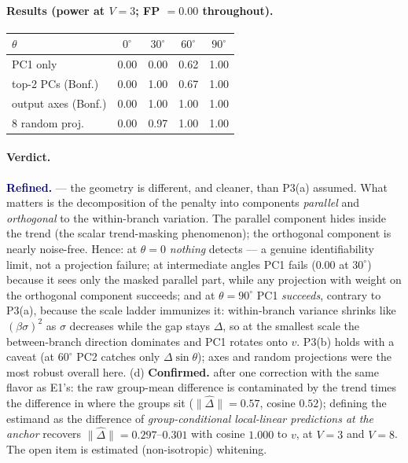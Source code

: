 \documentclass[11pt]{article}
\newcommand{\confirmed}{\textcolor{ok}{\textbf{Confirmed.}}}
\newcommand{\refined}{\textcolor{navy}{\textbf{Refined.}}}
\begin{document}
\paragraph{Results (power at $V{=}3$; FP $=0.00$ throughout).}
\begin{center}\small
\begin{tabular}{lcccc}
\toprule
$\theta$ & $0^\circ$ & $30^\circ$ & $60^\circ$ & $90^\circ$\\
\midrule
PC1 only            & 0.00 & 0.00 & 0.62 & 1.00\\
top-2 PCs (Bonf.)   & 0.00 & 1.00 & 0.67 & 1.00\\
output axes (Bonf.) & 0.00 & 1.00 & 1.00 & 1.00\\
8 random proj.      & 0.00 & 0.97 & 1.00 & 1.00\\
\bottomrule
\end{tabular}
\end{center}

\paragraph{Verdict.} \refined{} --- the geometry is different, and cleaner, than P3(a)
assumed. What matters is the decomposition of the penalty into components \emph{parallel}
and \emph{orthogonal} to the within-branch variation. The parallel component hides inside
the trend (the scalar trend-masking phenomenon); the orthogonal component is nearly
noise-free. Hence: at $\theta=0$ \emph{nothing} detects --- a genuine identifiability
limit, not a projection failure; at intermediate angles PC1 fails ($0.00$ at $30^\circ$)
because it sees only the masked parallel part, while any projection with weight on the
orthogonal component succeeds; and at $\theta=90^\circ$ PC1 \emph{succeeds}, contrary to
P3(a), because the scale ladder immunizes it: within-branch variance shrinks like
$(\beta\sigma)^2$ as $\sigma$ decreases while the gap stays $\Delta$, so at the smallest
scale the between-branch direction dominates and PC1 rotates onto $v$. P3(b) holds with a
caveat (at $60^\circ$ PC2 catches only $\Delta\sin\theta$); axes and random projections
were the most robust overall here. (d) \confirmed{} after one correction with the same
flavor as E1's: the raw group-mean difference is contaminated by the trend times the
difference in where the groups sit ($\|\widehat\Delta\|=0.57$, cosine $0.52$); defining
the estimand as the difference of \emph{group-conditional local-linear predictions at the
anchor} recovers $\|\widehat\Delta\|=0.297$--$0.301$ with cosine $1.000$ to $v$, at
$V{=}3$ and $V{=}8$. The open item is estimated (non-isotropic) whitening.
\end{document}
